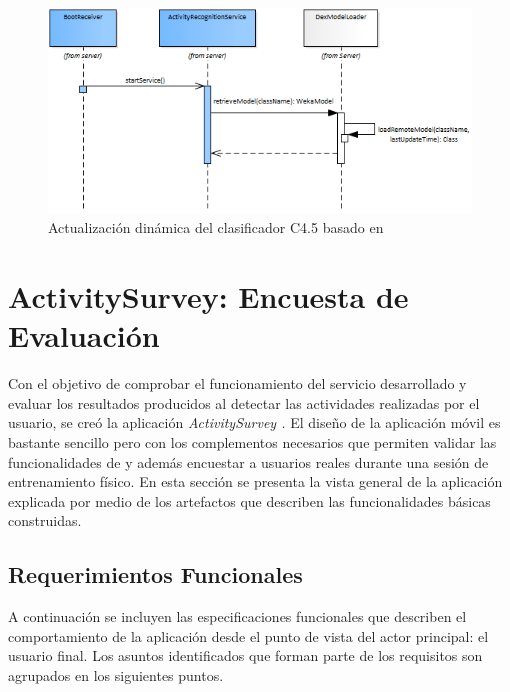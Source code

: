 \begin{figure}[H]
\begin{centering}
\includegraphics[width=1\columnwidth]{capitulo-5/graphics/service_classi}
\par\end{centering}
\caption[Actualización del clasificador C4.5]{\label{fig5:service-classi}Actualización dinámica del clasificador
C4.5 basado en }
\end{figure}


\section{ActivitySurvey: Encuesta de Evaluación}

\label{sec55:activity}Con el objetivo de comprobar el funcionamiento
del servicio \emph{} desarrollado y evaluar los resultados
producidos al detectar las actividades realizadas por el usuario,
se creó la aplicación \emph{ActivitySurvey \cite{GimenezYegros2016e}.
}El diseño de la aplicación móvil es bastante sencillo pero con los
complementos necesarios que permiten validar las funcionalidades de
\emph{} y además encuestar a usuarios reales durante
una sesión de entrenamiento físico. En esta sección se presenta la
vista general de la aplicación explicada por medio de los artefactos
que describen las funcionalidades básicas construidas. 

\subsection{Requerimientos Funcionales}

A continuación se incluyen las especificaciones funcionales que describen
el comportamiento de la aplicación desde el punto de vista del actor
principal: el usuario final. Los asuntos identificados que forman
parte de los requisitos son agrupados en los siguientes puntos.

